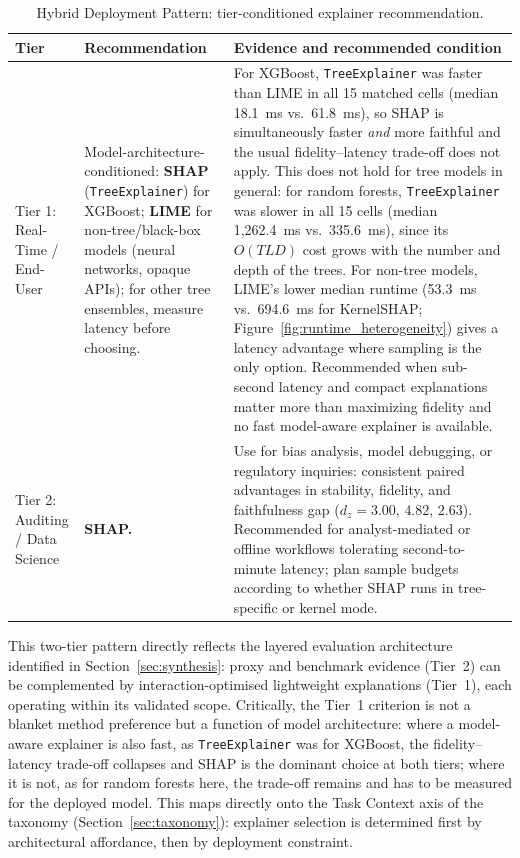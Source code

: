 \documentclass[10pt,a4paper,twoside]{article}
\begin{document}
\begin{table}[h]
\centering
\caption{Hybrid Deployment Pattern: tier-conditioned explainer recommendation.}
\label{tab:hybrid_deployment}
\begin{tabularx}{\linewidth}{p{2.0cm} >{\raggedright\arraybackslash}p{3.0cm} X}
\toprule
\textbf{Tier} & \textbf{Recommendation} & \textbf{Evidence and recommended condition} \\
\midrule
Tier 1: Real-Time / End-User &
Model-architecture-conditioned: \textbf{SHAP} (\texttt{TreeExplainer}) for
XGBoost; \textbf{LIME} for non-tree/black-box models (neural networks,
opaque APIs); for other tree ensembles, measure latency before choosing. &
For XGBoost, \texttt{TreeExplainer} was faster than LIME in all 15 matched
cells (median 18.1~ms vs.\ 61.8~ms), so SHAP is simultaneously faster
\emph{and} more faithful and the usual fidelity--latency trade-off does
not apply. This does not hold for tree models in general: for random
forests, \texttt{TreeExplainer} was slower in all 15 cells (median
1,262.4~ms vs.\ 335.6~ms), since its $O(TLD)$ cost grows with the number
and depth of the trees. For non-tree
models, LIME's lower median runtime (53.3~ms vs.\ 694.6~ms for
KernelSHAP; Figure~\ref{fig:runtime_heterogeneity}) gives a latency
advantage where sampling is the only option. Recommended when sub-second
latency and compact explanations matter more than maximizing fidelity
and no fast model-aware explainer is available. \\[6pt]
Tier 2: Auditing / Data Science &
\textbf{SHAP.} &
Use for bias analysis, model debugging, or regulatory inquiries: consistent
paired advantages in stability, fidelity, and faithfulness gap ($d_z =
3.00$, $4.82$, $2.63$). Recommended for analyst-mediated or offline
workflows tolerating second-to-minute latency; plan sample budgets
according to whether SHAP runs in tree-specific or kernel mode. \\
\bottomrule
\end{tabularx}
\end{table}

This two-tier pattern directly reflects the layered evaluation
architecture identified in Section~\ref{sec:synthesis}: proxy and
benchmark evidence (Tier~2) can be complemented by interaction-optimised
lightweight explanations (Tier~1), each operating within its validated
scope.  Critically, the Tier~1 criterion is not a blanket method preference
but a function of model architecture: where a model-aware explainer is
also fast, as \texttt{TreeExplainer} was for XGBoost, the fidelity--latency
trade-off collapses and SHAP is the dominant choice at both tiers; where it
is not, as for random forests here, the trade-off remains and has to be
measured for the deployed model.  This maps directly onto the Task Context axis of the taxonomy
(Section~\ref{sec:taxonomy}): explainer selection is determined first by
architectural affordance, then by deployment constraint.
\end{document}
